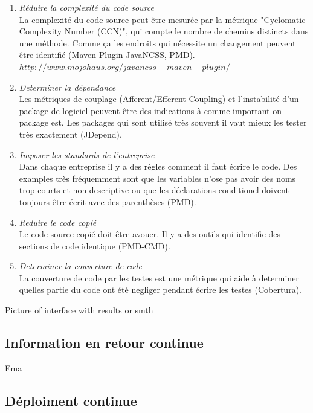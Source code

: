 \begin{enumerate}

\item \textit{Réduire la complexité du code source} \\ La complexité du code source peut être mesurée par la métrique "Cyclomatic Complexity Number (CCN)", qui compte le nombre de chemins distincts dans une méthode. Comme ça les endroits qui nécessite un changement peuvent être identifié (Maven Plugin JavaNCSS, PMD). $http://www.mojohaus.org/javancss-maven-plugin/$

\item \textit{Determiner la dépendance} \\ Les métriques de couplage (Afferent/Efferent Coupling) et l'instabilité d'un package de logiciel peuvent être des indications à comme important on package est. Les packages qui sont utilisé très souvent il vaut mieux les tester très exactement (JDepend).

\item \textit{Imposer les standards de l'entreprise}\\ Dans chaque entreprise il y a des régles comment il faut écrire le code. Des examples très fréquemment sont que les variables n'ose pas avoir des noms trop courts et non-descriptive ou que les déclarations conditionel doivent toujours être écrit avec des parenthèses (PMD).
\item \textit{Reduire le code copié} \\ Le code source copié doit être avouer. Il y a des outils qui identifie des sections de code identique (PMD-CMD).

\item \textit{Determiner la couverture de code} \\ La couverture de code par les testes est une métrique qui aide à determiner quelles partie du code ont été negliger pendant écrire les testes (Cobertura).

\end{enumerate}

Picture of interface with results or smth

\subsection{Information en retour continue}

Ema

\subsection{Déploiment continue}

